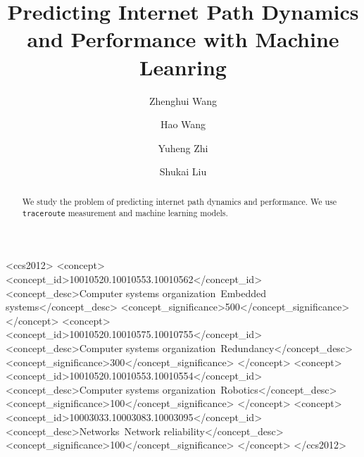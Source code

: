 \documentclass[sigconf]{acmart}
\begin{document}
	\title{Predicting Internet Path Dynamics and Performance with Machine Leanring}
	
	
	\author{Zhenghui Wang}
	
	\author{Hao Wang}
	
	\author{Yuheng Zhi}
	
	\author{Shukai Liu}
	
	\renewcommand{\shortauthors}{CN Group}
	
	
	\begin{abstract}
		We study the problem of predicting internet path dynamics and performance. We use \texttt{traceroute} measurement and machine learning models.
	\end{abstract}
	
	\begin{CCSXML}
		<ccs2012>
		<concept>
		<concept_id>10010520.10010553.10010562</concept_id>
		<concept_desc>Computer systems organization~Embedded systems</concept_desc>
		<concept_significance>500</concept_significance>
		</concept>
		<concept>
		<concept_id>10010520.10010575.10010755</concept_id>
		<concept_desc>Computer systems organization~Redundancy</concept_desc>
		<concept_significance>300</concept_significance>
		</concept>
		<concept>
		<concept_id>10010520.10010553.10010554</concept_id>
		<concept_desc>Computer systems organization~Robotics</concept_desc>
		<concept_significance>100</concept_significance>
		</concept>
		<concept>
		<concept_id>10003033.10003083.10003095</concept_id>
		<concept_desc>Networks~Network reliability</concept_desc>
		<concept_significance>100</concept_significance>
		</concept>
		</ccs2012>  
	\end{CCSXML}
	
\end{document}
